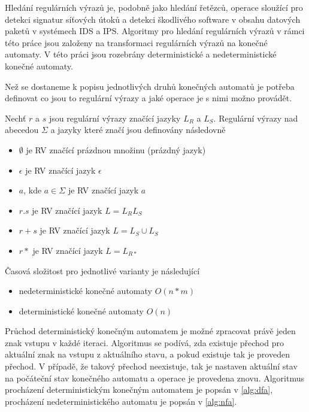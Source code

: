 Hledání regulárních výrazů je, podobně jako hledání řetězců, operace sloužící pro detekci signatur
síťových útoků a detekci škodlivého software v obsahu datových paketů v systémech IDS a IPS.
Algoritmy pro hledání regulárních výrazů v rámci této práce jsou založeny na transformaci
regulárních výrazů na konečné automaty.
V této práci jsou rozebrány deterministické a nedeterministické konečné automaty.

Než se dostaneme k popisu jednotlivých druhů konečných automatů je potřeba definovat co jsou to regulární
výrazy a jaké operace je s nimi možno provádět.

Nechť $r$ a $s$ jsou regulární výrazy značící jazyky $L_R$ a $L_S$.
Regulární výrazy nad abecedou $\Sigma$ a jazyky které značí jsou definovány následovně

\begin{itemize}
    \item{$\emptyset$ je RV značící prázdnou množinu (prázdný jazyk)}
    \item{$\epsilon$ je RV značící jazyk ${\epsilon}$}
    \item{$a$, kde $a \in \Sigma$ je RV značící jazyk ${a}$}
    \item{$r.s$ je RV značící jazyk $L = L_R L_S$}
    \item{$r+s$ je RV značící jazyk $L = L_S \cup L_S$}
    \item{$r*$ je RV značící jazyk $L = L_{R*}$}
\end{itemize}

Časová složitost pro jednotlivé varianty je následující

\begin{itemize}
\item{nedeterministické konečné automaty $O(n*m)$}
\item{deterministické konečné automaty $O(n)$}
\end{itemize}

Průchod deterministický konečným automatem je možné zpracovat právě jeden znak vstupu v
každé iteraci. Algoritmus se podívá, zda existuje přechod pro aktuální znak na vstupu z aktuálního stavu,
a pokud existuje tak je proveden přechod. V případě, že takový přechod neexistuje, tak je nastaven
aktuální stav na počáteční stav konečného automatu a operace je provedena znovu.
Algoritmus procházení deterministickým konečným automatem je popsán v \ref{alg:dfa},
procházení nedeterministického automatu je popsán v \ref{alg:nfa}.


